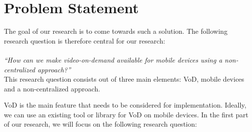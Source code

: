 \section{Problem Statement}
The goal of our research is to come towards such a solution. The following research question is therefore central for our research:\\
\\
\textit{``How can we make video-on-demand available for mobile devices using a non-centralized approach?''}\\

This research question consists out of three main elements: VoD, mobile devices and a non-centralized approach.

VoD is the main feature that needs to be considered for implementation. Ideally, we can use an existing tool or library for VoD on mobile devices. In the first part of our research, we will focus on the following research question:


